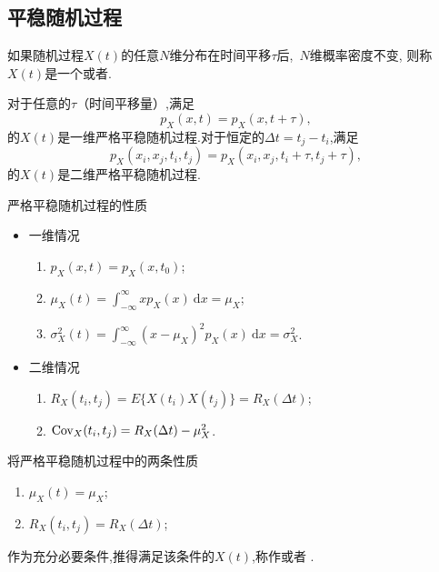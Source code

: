 \documentclass[cn,10pt,citestyle=gb7714-2015,bibstyle=gb7714-2015]{elegantbook}
\newcommand{\md}{\ \mathrm{d}}
\newcommand{\Cov}{\textup{Cov}}
\begin{document}
\subsection{平稳随机过程}
\begin{definition}[严格平稳随机过程]\label{def:strsta-rand-process}
  如果随机过程$X(t)$的任意$N$维分布在时间平移$\tau$后,\ $N$维概率密度不变,
  则称$X(t)$是一个或者.

  对于任意的$\tau$（时间平移量）,满足
  \begin{equation}\label{eq:strsta1}
    p_X(x,t)=p_X(x,t+\tau),
  \end{equation}
  的$X(t)$是一维严格平稳随机过程.对于恒定的$\Delta t=t_j-t_i$,满足
  \begin{equation}\label{eq:strsta2}
    p_X(x_i,x_j,t_i,t_j)=p_X(x_i,x_j,t_i+\tau,t_j+\tau),
  \end{equation}
  的$X(t)$是二维严格平稳随机过程.
\end{definition}
\begin{property}严格平稳随机过程的性质
  \begin{itemize}
    \item 一维情况
  \begin{enumerate}
    \item $p_X(x,t)=p_X(x,t_0)$;
    \item $\displaystyle \mu_X(t)=\int_{-\infty}^\infty xp_X(x)\md x=\mu_X$;
    \item $\displaystyle \sigma_X^2(t)=\int_{-\infty}^\infty(x-\mu_X)^2p_X(x)\md x=\sigma_X^2$.
  \end{enumerate}
  \item 二维情况
  \begin{enumerate}
    \item $R_X(t_i,t_j)=E\{X(t_i)X(t_j)\}=R_X(\Delta t)$;
    \item $\Cov_X(t_i,t_j)=R_X(\Delta t)-\mu_X^2$.
  \end{enumerate}
  \end{itemize}
\end{property}
\begin{definition}[广义平稳随机过程]\label{def:gensta-rand-process}
  将严格平稳随机过程中的两条性质
  \begin{enumerate}
    \item $\mu_X(t)=\mu_X$;
    \item $R_X(t_i,t_j)=R_X(\Delta t)$;
  \end{enumerate}
  作为充分必要条件,推得满足该条件的$X(t)$,称作或者
  .
\end{definition}
\end{document}
